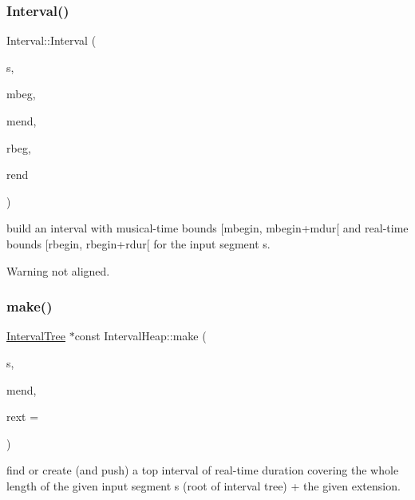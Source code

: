 \subsubsection{\texorpdfstring{Interval()}{Interval()}\hspace{0.1cm}{\footnotesize\ttfamily [2/2]}}
{\footnotesize\ttfamily Interval\+::\+Interval (\begin{DoxyParamCaption}\item[{const \mbox{\hyperlink{classInputSegment}{Input\+Segment}} $\ast$}]{s,  }\item[{\mbox{\hyperlink{classRational}{Rational}}}]{mbeg,  }\item[{\mbox{\hyperlink{classRational}{Rational}}}]{mend,  }\item[{double}]{rbeg,  }\item[{double}]{rend }\end{DoxyParamCaption})\hspace{0.3cm}{\ttfamily [protected]}}



build an interval with musical-\/time bounds \mbox{[}mbegin, mbegin+mdur\mbox{[} and real-\/time bounds \mbox{[}rbegin, rbegin+rdur\mbox{[} for the input segment s. 

\begin{DoxyWarning}{Warning}
not aligned. 
\end{DoxyWarning}
\mbox{\label{group__segment_gad7fd7dd4ddb8d520df0985e67d180019}} 
\subsubsection{\texorpdfstring{make()}{make()}\hspace{0.1cm}{\footnotesize\ttfamily [1/2]}}
{\footnotesize\ttfamily \mbox{\hyperlink{classIntervalTree}{Interval\+Tree}} $\ast$const Interval\+Heap\+::make (\begin{DoxyParamCaption}\item[{const \mbox{\hyperlink{classInputSegment}{Input\+Segment}} $\ast$}]{s,  }\item[{\mbox{\hyperlink{classRational}{Rational}}}]{mend,  }\item[{double}]{rext = {} }\end{DoxyParamCaption})}



find or create (and push) a top interval of real-\/time duration covering the whole length of the given input segment s (root of interval tree) + the given extension. 


